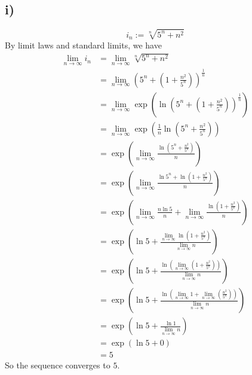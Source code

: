 \documentclass{article}
\newcommand{\limn}{\lim_{n\to\infty}}
\theoremstyle{mytheoremstyle}
\theoremstyle{mytheoremstyle}
\theoremstyle{myproblemstyle}
\begin{document}
    \subsection{i)}
    $$i_n := \sqrt[n]{5^n + n^2}$$
    By limit laws and standard limits, we have
        \begin{align*}
            \limn{i_n} &= \limn{\sqrt[n]{5^n + n^2}} \\
            &= \limn{\left(5^n+\left(1+\frac{n^2}{5^n}\right)\right)^{\frac{1}{n}}} \\
            &= \limn{\exp{\left(\ln{\left(5^n+\left(1+\frac{n^2}{5^n}\right)\right)^{\frac{1}{n}}}\right)}} \\
            &= \limn{\exp\left(\frac{1}{n}\ln{\left(5^n+\frac{n^2}{5^n}\right)}\right)} \\
            &= \exp\left(\limn{\frac{\ln{\left(5^n+\frac{n^2}{5^n}\right)}}{n}}\right) \\
            &= \exp\left(\limn{\frac{\ln{5^n} + \ln{\left(1+\frac{n^2}{5^n}\right)}}{n}}\right) \\
            &= \exp\left(\limn{\frac{n\ln{5}}{n} + \limn{\frac{\ln{\left(1+\frac{n^2}{5^n}\right)}}{n}}}\right) \\
            &= \exp\left(\ln{5} + \frac{\limn{\ln\left(1+\frac{n^2}{5^n}\right)}}{\limn{n}}\right) \\
            &= \exp\left(\ln{5} + \frac{\ln(\limn\left(1+\frac{n^2}{5^n}\right))}{\limn{n}}\right) \\
            &= \exp\left(\ln{5} + \frac{\ln\left(\limn 1 + \limn\left(\frac{n^2}{5^n}\right)\right)}{\limn{n}}\right) \\
            &= \exp\left(\ln{5} + \frac{\ln{1}}{\limn n}\right) \\
            &= \exp\left(\ln{5} + 0\right) \\
            &= 5
        \end{align*}
        So the sequence converges to $5$.
\end{document}
